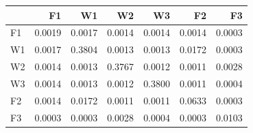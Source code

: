\begin{tabular}{lrrrrrr}
\toprule
 & F1 & W1 & W2 & W3 & F2 & F3 \\
\midrule
F1 & 0.0019 & 0.0017 & 0.0014 & 0.0014 & 0.0014 & 0.0003 \\
W1 & 0.0017 & 0.3804 & 0.0013 & 0.0013 & 0.0172 & 0.0003 \\
W2 & 0.0014 & 0.0013 & 0.3767 & 0.0012 & 0.0011 & 0.0028 \\
W3 & 0.0014 & 0.0013 & 0.0012 & 0.3800 & 0.0011 & 0.0004 \\
F2 & 0.0014 & 0.0172 & 0.0011 & 0.0011 & 0.0633 & 0.0003 \\
F3 & 0.0003 & 0.0003 & 0.0028 & 0.0004 & 0.0003 & 0.0103 \\
\bottomrule
\end{tabular}
